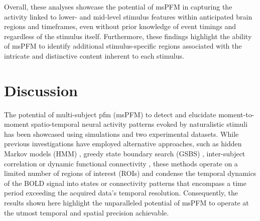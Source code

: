 Overall, these analyses showcase the potential of msPFM in capturing the
activity linked to lower- and mid-level stimulus features within anticipated
brain regions and timeframes, even without prior knowledge of event timings and
regardless of the stimulus itself. Furthermore, these findings highlight the
ability of msPFM to identify additional stimulus-specific regions associated
with the intricate and distinctive content inherent to each stimulus.

\section{Discussion}
\label{sec:multi_subject_discussion}

The potential of multi-subject \acrlong*{pfm} (msPFM) to detect and elucidate
moment-to-moment spatio-temporal neural activity patterns evoked by naturalistic
stimuli has been showcased using simulations and two experimental datasets.
While previous investigations have employed alternative approaches, such as
hidden Markov models (HMM) \citep{Baldassano2017DiscoveringEventStructure},
greedy state boundary search (GSBS) \citep{Geerligs2021Detectingneuralstate},
inter-subject correlation \citep{Nastase2019Measuringsharedresponses} or dynamic
functional connectivity \citep{Di2020Intersubjectconsistentdynamic}, these
methods operate on a limited number of regions of interest (ROIs) and condense
the temporal dynamics of the BOLD signal into states or connectivity patterns
that encompass a time period exceeding the acquired data's temporal resolution.
Consequently, the results shown here highlight the unparalleled potential of
msPFM to operate at the utmost temporal and spatial precision achievable.

